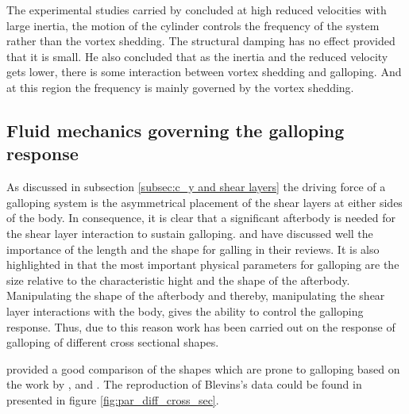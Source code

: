  The experimental studies carried by \citet{bouclin:77} concluded at high reduced velocities with large inertia, the motion of the cylinder controls the frequency of the system rather than the vortex shedding. The structural damping has no effect provided that it is small. He also concluded that as the inertia and the reduced velocity gets lower, there is some interaction between vortex shedding and galloping. And at this region the frequency is mainly governed by the vortex shedding. 
 
 
 \subsection{Fluid mechanics governing the galloping response}
 \label{subsec:fluid_mechanics_of_galloping}
 
 As discussed in subsection \ref{subsec:c_y and shear layers} the driving force of a galloping system is the asymmetrical placement of the shear layers at either sides of the body. In consequence, it is clear that a significant afterbody is needed for the shear layer interaction to sustain galloping. \citet{Parkinson1974,Parkinson1989} and \citet{Bearman1987} have discussed well the importance of the length and the shape for galling in their reviews. It is also highlighted in \citet{Parkinson1974} that the most important physical parameters for galloping are the size relative to the characteristic hight and the shape of the afterbody. Manipulating the shape of the afterbody and thereby, manipulating the shear layer interactions with the body, gives the ability to control the galloping response. Thus, due to this reason work has been carried out on the response of galloping of different cross sectional shapes. 
 
 \citet{Blevins1990} provided a good comparison of the shapes which are prone to galloping based on the work by \citet{Parkinson1961}, \citet{Nakamura1975a} and \citet{Nakamura1977}. The reproduction of Blevins's data could be found in \citet{Paidoussis2010} presented in figure \ref{fig:par_diff_cross_sec}. 
    
 
  
